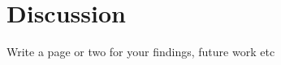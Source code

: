 \documentclass[../../main/thesis_msc.tex]{subfiles}
\begin{document}
	\chapter{Discussion}
	
		Write a page or two for your findings, future work etc
	
		
\end{document}

